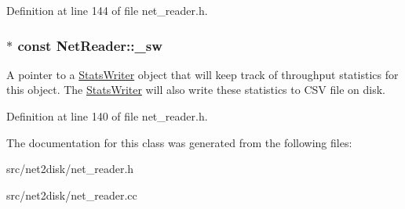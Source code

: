 Definition at line 144 of file net\_\-reader.h.

\hypertarget{class_net_reader_a73d95d4fdb1065e26e2e8eed2b64d534}{
\subsubsection[{\_\-sw}]{$\ast$ const {\bf NetReader::\_\-sw}}}
\label{class_net_reader_a73d95d4fdb1065e26e2e8eed2b64d534}
A pointer to a \hyperlink{class_stats_writer}{StatsWriter} object that will keep track of throughput statistics for this object. The \hyperlink{class_stats_writer}{StatsWriter} will also write these statistics to CSV file on disk. 

Definition at line 140 of file net\_\-reader.h.



The documentation for this class was generated from the following files:\begin{DoxyCompactItemize}
\item 
src/net2disk/net\_\-reader.h\item 
src/net2disk/net\_\-reader.cc\end{DoxyCompactItemize}
